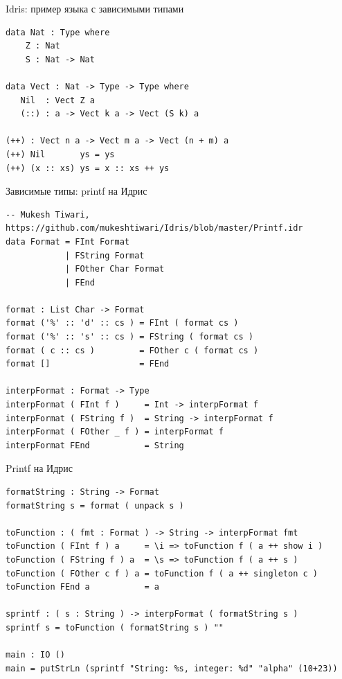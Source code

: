 \documentclass[aspectratio=169]{beamer}
\begin{document}
\begin{frame}[fragile]{Idris: пример языка с зависимыми типами}
\small
\begin{verbatim}
data Nat : Type where
    Z : Nat
    S : Nat -> Nat

data Vect : Nat -> Type -> Type where
   Nil  : Vect Z a
   (::) : a -> Vect k a -> Vect (S k) a

(++) : Vect n a -> Vect m a -> Vect (n + m) a
(++) Nil       ys = ys
(++) (x :: xs) ys = x :: xs ++ ys
\end{verbatim}
\end{frame}

\begin{frame}[fragile]{Зависимые типы: printf на Идрис}
\small
\begin{verbatim}
-- Mukesh Tiwari, https://github.com/mukeshtiwari/Idris/blob/master/Printf.idr
data Format = FInt Format
            | FString Format
            | FOther Char Format
            | FEnd

format : List Char -> Format
format ('%' :: 'd' :: cs ) = FInt ( format cs )
format ('%' :: 's' :: cs ) = FString ( format cs )
format ( c :: cs )         = FOther c ( format cs )
format []                  = FEnd

interpFormat : Format -> Type
interpFormat ( FInt f )     = Int -> interpFormat f
interpFormat ( FString f )  = String -> interpFormat f
interpFormat ( FOther _ f ) = interpFormat f
interpFormat FEnd           = String
\end{verbatim}
\end{frame}

\begin{frame}[fragile]{Printf на Идрис}
\small
\begin{verbatim}
formatString : String -> Format
formatString s = format ( unpack s )

toFunction : ( fmt : Format ) -> String -> interpFormat fmt
toFunction ( FInt f ) a     = \i => toFunction f ( a ++ show i )
toFunction ( FString f ) a  = \s => toFunction f ( a ++ s )
toFunction ( FOther c f ) a = toFunction f ( a ++ singleton c )
toFunction FEnd a           = a 

sprintf : ( s : String ) -> interpFormat ( formatString s )
sprintf s = toFunction ( formatString s ) ""

main : IO ()
main = putStrLn (sprintf "String: %s, integer: %d" "alpha" (10+23))
\end{verbatim}
\end{frame}
\end{document}
